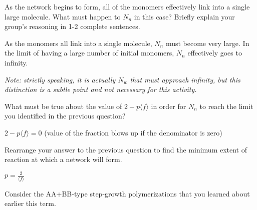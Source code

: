 \begin{activity}
\begin{ctqs}
	\question As the network begins to form, all of the monomers effectively link into a single large molecule.  What must happen to $N_n$ in this case?  Briefly explain your group's reasoning in 1-2 complete sentences.
	
		\begin{solution}[1.5in]
			As the monomers all link into a single molecule, $N_n$ must become very large.  In the limit of having a large number of initial monomers, $N_n$ effectively goes to infinity.
			
			\emph{Note: strictly speaking, it is actually $N_w$ that must approach infinity, but this distinction is a subtle point and not necessary for this activity.}
		\end{solution}
	
	\question What must be true about the value of $2-p\langle f \rangle$ in order for $N_n$ to reach the limit you identified in the previous question?
	
		\begin{solution}[1.5in]
			$2-p\langle f\rangle = 0$ (value of the fraction blows up if the denominator is zero)
		\end{solution}
	
	\question Rearrange your answer to the previous question to find the minimum extent of reaction at which a network will form.
	
		\begin{solution}[1in]
			$p = \frac{2}{\langle f \rangle}$
		\end{solution}
\end{ctqs}


\begin{exercises}

	
	
	
	\exercise Consider the AA+BB-type step-growth polymerizations that you learned about earlier this term.
	

\end{exercises}
\end{activity}
